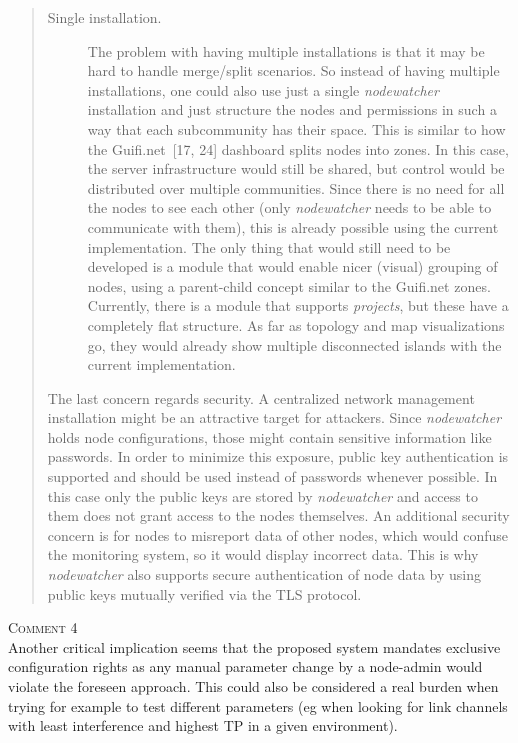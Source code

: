 \documentclass[12pt,twoside,a4paper]{report}
\newcommand{\nodewatcher}{\textit{nodewatcher}}
\begin{document}
\begin{quote}
\begin{description}
    \item[Single installation.] The problem with having multiple installations is that it may be hard to handle merge/split scenarios.
    So instead of having multiple installations, one could also use just a single \nodewatcher{} installation and just structure the nodes and permissions in such a way that each subcommunity has their space.
    This is similar to how the Guifi.net~[17, 24] dashboard splits nodes into zones.
    In this case, the server infrastructure would still be shared, but control would be distributed over multiple communities.
    Since there is no need for all the nodes to see each other (only \nodewatcher{} needs to be able to communicate with them), this is already possible using the current implementation.
    The only thing that would still need to be developed is a module that would enable nicer (visual) grouping of nodes, using a parent-child concept similar to the Guifi.net zones.
    Currently, there is a module that supports \textit{projects}, but these have a completely flat structure.
    As far as topology and map visualizations go, they would already show multiple disconnected islands with the current implementation.
\end{description}

The last concern regards security.
A centralized network management installation might be an attractive target for attackers.
Since \nodewatcher{} holds node configurations, those might contain sensitive information like passwords.
In order to minimize this exposure, public key authentication is supported and should be used instead of passwords whenever possible.
In this case only the public keys are stored by \nodewatcher{} and access to them does not grant access to the nodes themselves.
An additional security concern is for nodes to misreport data of other nodes, which would confuse the monitoring system, so it would display incorrect data.
This is why \nodewatcher{} also supports secure authentication of node data by using public keys mutually verified via the TLS protocol.
\end{quote}

\vspace{0.5cm}\noindent\textsc{Comment 4}\\
Another critical implication seems that the proposed system mandates exclusive configuration rights as any manual parameter change by a node-admin would violate the foreseen approach. This could also be considered a real burden when trying for example to test different parameters (eg when looking for link channels with least interference and highest TP in a given environment).
\end{document}
